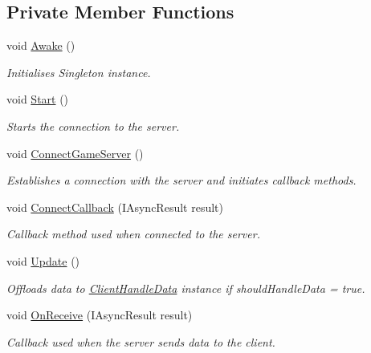 \subsection*{Private Member Functions}
\begin{DoxyCompactItemize}
\item 
void \mbox{\hyperlink{class_network_a06900213a71f1f8d61c67ca99cb78df9}{Awake}} ()
\begin{DoxyCompactList}\small\item\em Initialises Singleton instance. \end{DoxyCompactList}\item 
void \mbox{\hyperlink{class_network_a52a8cefa1ecd639175ae18f217342783}{Start}} ()
\begin{DoxyCompactList}\small\item\em Starts the connection to the server. \end{DoxyCompactList}\item 
void \mbox{\hyperlink{class_network_aace0678d55f269c25983131dd673e857}{Connect\+Game\+Server}} ()
\begin{DoxyCompactList}\small\item\em Establishes a connection with the server and initiates callback methods. \end{DoxyCompactList}\item 
void \mbox{\hyperlink{class_network_ac1b0ebf3c19d645003a1238a0fa1ad64}{Connect\+Callback}} (I\+Async\+Result result)
\begin{DoxyCompactList}\small\item\em Callback method used when connected to the server. \end{DoxyCompactList}\item 
void \mbox{\hyperlink{class_network_ace78b88ac04b110eeaa5f51fdd643780}{Update}} ()
\begin{DoxyCompactList}\small\item\em Offloads data to \mbox{\hyperlink{class_client_handle_data}{Client\+Handle\+Data}} instance if should\+Handle\+Data = true. \end{DoxyCompactList}\item 
void \mbox{\hyperlink{class_network_af1c962bbf03c6221e052ed8fd5c174a9}{On\+Receive}} (I\+Async\+Result result)
\begin{DoxyCompactList}\small\item\em Callback used when the server sends data to the client. \end{DoxyCompactList}\end{DoxyCompactItemize}
